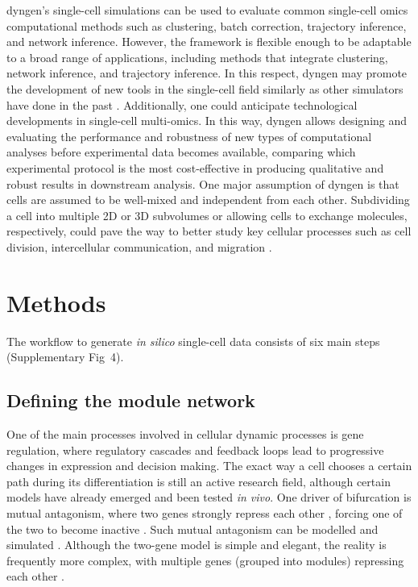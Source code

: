 \documentclass[
  table,
  10pt,
  a4paper]{article}
\begin{document}
dyngen's single-cell simulations can be used to evaluate common
single-cell omics computational methods such as clustering, batch
correction, trajectory inference, and network inference. However, the
framework is flexible enough to be adaptable to a broad range of
applications, including methods that integrate clustering, network
inference, and trajectory inference. In this respect, dyngen may promote
the development of new tools in the single-cell field similarly as other
simulators have done in the past
\autocite{schaffter_genenetweaversilicobenchmark_2011,ewing_combiningtumorgenome_2015}.
Additionally, one could anticipate technological developments in
single-cell multi-omics. In this way, dyngen allows designing and
evaluating the performance and robustness of new types of computational
analyses before experimental data becomes available, comparing which
experimental protocol is the most cost-effective in producing
qualitative and robust results in downstream analysis. One major
assumption of dyngen is that cells are assumed to be well-mixed and
independent from each other. Subdividing a cell into multiple 2D or 3D
subvolumes or allowing cells to exchange molecules, respectively, could
pave the way to better study key cellular processes such as cell
division, intercellular communication, and migration
\autocite{smith_spatialstochasticintracellular_2019}.

\newpage

\hypertarget{sec:dyngen-methods}{%
\section{Methods}\label{sec:dyngen-methods}}

The workflow to generate \emph{in silico} single-cell data consists of
six main steps (Supplementary Fig~4).

\hypertarget{sec:dyngen-modules}{%
\subsection{Defining the module network}\label{sec:dyngen-modules}}

One of the main processes involved in cellular dynamic processes is gene
regulation, where regulatory cascades and feedback loops lead to
progressive changes in expression and decision making. The exact way a
cell chooses a certain path during its differentiation is still an
active research field, although certain models have already emerged and
been tested \emph{in vivo}. One driver of bifurcation is mutual
antagonism, where two genes strongly repress each other
\autocite{rekhtman_directinteractionhematopoietic_1999,xu_regulationbifurcatingcell_2015},
forcing one of the two to become inactive
\autocite{graf_forcingcellschange_2009}. Such mutual antagonism can be
modelled and simulated
\autocite{wang_quantifyingwaddingtonlandscape_2011,ferrell_bistabilitybifurcationswaddington_2012}.
Although the two-gene model is simple and elegant, the reality is
frequently more complex, with multiple genes (grouped into modules)
repressing each other \autocite{yosef_dynamicregulatorynetwork_2013}.
\end{document}
